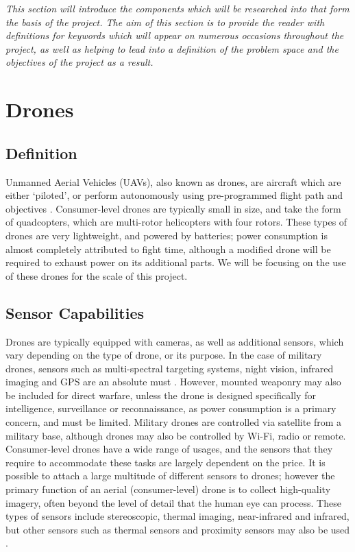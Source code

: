 \emph{This section will introduce the components which will be researched into that form the basis of the project. The aim of this section is to provide the reader with definitions for keywords which will appear on numerous occasions throughout the project, as well as helping to lead into a definition of the problem space and the objectives of the project as a result.}
	\section{Drones}
		\subsection{Definition}
		Unmanned Aerial Vehicles (UAVs), also known as drones, are aircraft which are either ‘piloted’, or perform autonomously using pre-programmed flight path and objectives \cite{chriscolejimwright2010}. Consumer-level drones are typically small in size, and take the form of quadcopters, which are multi-rotor helicopters with four rotors.  These types of drones are very lightweight, and powered by batteries; power consumption is almost completely attributed to fight time, although a modified drone will be required to exhaust power on its additional parts. We will be focusing on the use of these drones for the scale of this project.
		\subsection{Sensor Capabilities}
		Drones are typically equipped with cameras, as well as additional sensors, which vary depending on the type of drone, or its purpose. In the case of military drones, sensors such as multi-spectral targeting systems, night vision, infrared imaging and GPS are an absolute must \cite{usairforce2015}. However, mounted weaponry may also be included for direct warfare, unless the drone is designed specifically for intelligence, surveillance or reconnaissance, as power consumption is a primary concern, and must be limited. Military drones are controlled via satellite from a military base, although drones may also be controlled by Wi-Fi, radio or remote. Consumer-level drones have a wide range of usages, and the sensors that they require to accommodate these tasks are largely dependent on the price. It is possible to attach a large multitude of different sensors to drones; however the primary function of an aerial (consumer-level) drone is to collect high-quality imagery, often beyond the level of detail that the human eye can process.  These types of sensors include stereoscopic, thermal imaging, near-infrared and infrared, but other sensors such as thermal sensors and proximity sensors may also be used \cite{ questuav2015}.
